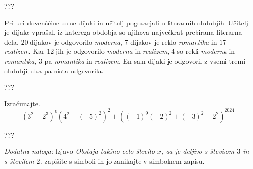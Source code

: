 \documentclass[addpoints,12pt]{exam}
\begin{document}
\begin{questions}

    \begin{solution}[9cm]
        ???
            \end{solution}

\newpage
    
    \question
    Pri uri slovenščine so se dijaki in učitelj pogovarjali o literarnih obdobjih.  Učitelj je dijake vprašal, iz katerega obdobja so njihova največkrat prebirana literarna dela.
    $20$ dijakov je odgovorilo \textit{moderna}, $7$ dijakov je reklo \textit{romantika} in $17$ \textit{realizem}. Kar $12$ jih je odgovorilo \textit{moderna} in \textit{realizem}, $4$ so rekli \textit{moderna} in \textit{romantika},
    $3$ pa \textit{romantika} in \textit{realizem}. En sam dijaki je odgovoril z vsemi tremi obdobji, dva pa nista odgovorila. 

    \begin{solution}[8cm]
        ???
            \end{solution}




    \newpage
        

    \question[4]
    Izračunajte. $$ \left(3^2-2^3\right)^6\left(4^2-(-5)^2\right)^2+\left((-1)^9(-2)^2+(-3)^2-2^2\right)^{2024}$$
    \begin{solution}[9cm]
        ???
            \end{solution}

    
    \bonusquestion[3]
    \textit{Dodatna naloga:} Izjavo \textit{Obstaja takšno celo število $x$, da je deljivo s številom $3$ in s številom $2$.} zapišite s simboli in jo zanikajte v simbolnem zapisu.


\end{questions}
\end{document}
